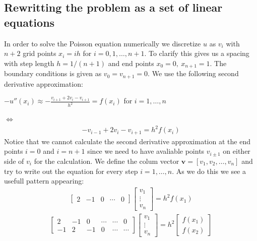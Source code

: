\documentclass[american,a4paper,12pt]{article}
\renewcommand{\vec}[1]{\mathbf{#1}} %
\begin{document}
  \subsection{Rewritting the problem as a set of linear equations}
    In order to solve the Poisson equation numerically we discretize $u$ as $v_i$ with $n + 2$ grid points $x_i = ih$ for $i = 0, 1, \hdots, n + 1$. To clarify this gives us a spacing with step length $h = 1/(n + 1)$ and end points $x_0 = 0, \ x_{n+1} = 1$. The boundary conditions is given as $v_0 = v_{n+1} = 0$. We use the following second derivative approximation:
    \begin{center}
      $-u''(x_i) \approx -\frac{v_{i+1} + 2v_i - v_{i+1}}{h^2} =  f(x_i)$ \quad for $i = 1, \hdots, n$
    \end{center}
    $\Longleftrightarrow$
    \begin{align*}
      -v_{i-1} + 2v_i - v_{i+1} = h^2f(x_i)
    \end{align*}
    Notice that we cannot calculate the second derivative approximation at the end points $i = 0$ and $i = n + 1$ since we need to have avaliable points $v_{i \pm 1}$ on either side of $v_i$ for the calculation. We define the colum vector $\vec{v} = [v_1, v_2, \hdots, v_n]$ and try to write out the equation for every step $i = 1, \hdots, n$. As we do this we see a usefull pattern appearing:
    \begin{align*}
          \begin{bmatrix}
            2 & -1 & 0 & \cdots & 0
          \end{bmatrix}
          \begin{bmatrix}
            v_1 \\
            \vdots \\
            v_n
          \end{bmatrix}
    = h^2f(x_1)
    \end{align*}
    \begin{align*}
          \begin{bmatrix}
            2 & -1 & 0 & \cdots & \cdots & 0 \\
            -1 & 2 & -1 & 0 & \cdots & \cdots
          \end{bmatrix}
          \begin{bmatrix}
            v_1 \\
            \vdots \\
            v_n
          \end{bmatrix}
    = h^2
          \begin{bmatrix}
            f(x_1) \\
            f(x_2)
          \end{bmatrix}
    \end{align*}
\end{document}

